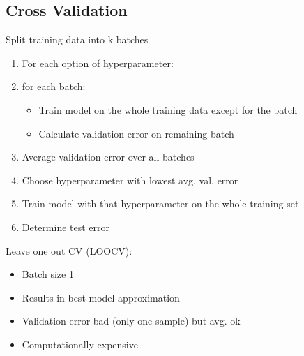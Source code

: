 \subsection{Cross Validation}

Split training data into k batches
\begin{enumerate}
    \item For each option of hyperparameter:
    \item for each batch: \begin{itemize}
        \item Train model on the whole training data except for the batch
        \item Calculate validation error on remaining batch
    \end{itemize}
    \item Average validation error over all batches
    \item Choose hyperparameter with lowest avg. val. error
    \item Train model with that hyperparameter on the whole training set
    \item Determine test error
\end{enumerate}

Leave one out CV (LOOCV): 
\begin{itemize}
    \item Batch size 1
    \item Results in best model approximation
    \item Validation error bad (only one sample) but avg. ok
    \item Computationally expensive 
\end{itemize}